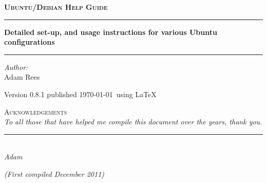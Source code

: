 \begin{center}
\thispagestyle{plain}

\vspace*{5cm}

\textsc{\huge\textbf{Ubuntu/Debian Help Guide}}\\[2.5cm]

\hrule
\vspace{0.5cm}
{\Huge \textbf{Detailed set-up, and usage instructions for various Ubuntu configurations}} \\[0.5cm]
\hrule
\vspace{2.5cm}
\LARGE \emph{Author:}\\ Adam Rees
\vfill

\large Version 0.8.1 published \today ~using \LaTeX
\end{center}

\newpage

\begin{center}

\vspace*{1cm}

{\Huge\textsc{Acknowledgements}}\\[4.5cm]
\textit{To all those that have helped me compile this document over the years, thank you.}\\[1.5cm]
\begin{flushright}
\rule{5cm}{0.25mm}\\[0.1cm]
{\large\textsl{Adam}}
\end{flushright}
\vfill
\large \textit{(First compiled December 2011)}
\end{center}

\tableofcontents
\listoftables
\listoffigures